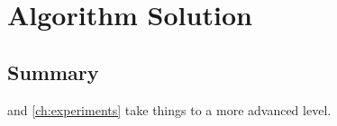 
\def\chapdir{./ChapterPerception}

\chapter{Algorithm Solution}\label{ch:perception}










\section{Summary}

 and \autoref{ch:experiments} take things to a more advanced level.
